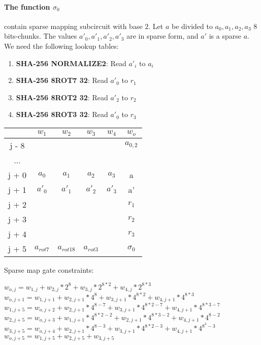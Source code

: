 \paragraph{The function $\sigma_0$} contain sparse mapping subcircuit with base $2$.
Let $a$ be divided to $a_0, a_1, a_2, a_3$ 8 bits-chunks.
The values $a'_0, a'_1, a'_2, a'_3$ are in sparse form, and $a'$ is a sparse $a$.
We need the following lookup tables:
\begin{enumerate}
\item \textbf{SHA-256 NORMALIZE2}: Read $a'_i$ to $a_i$
\item \textbf{SHA-256 8ROT7 32}: Read $a'_0$ to $r_1$
\item \textbf{SHA-256 8ROT2 32}: Read $a'_2$ to $r_2$
\item \textbf{SHA-256 8ROT3 32}: Read $a'_0$ to $r_3$
\end{enumerate}
\begin{center}
\begin{tabular}{ |c|c|c|c|c|c } 
  & $w_1$ & $w_2$ & $w_3$ & $w_4$ & $w_o$\\ 
 \hline
j - 8 &  &  &  &  & $a_{0, 2}$\\ 
... &&&&& \\
j + 0 & $a_0$ & $ a_1$ & $a_2$ & $a_3$ & a\\ 
j + 1 & $a'_0$ & $a'_1$ & $a'_2$ & $a'_3$ & a' \\ 
j + 2 & &  &  &  & $r_1$ \\
j + 3 & &  &  &  & $r_2 $ \\ 
j + 4 & &  &  &  & $r_3 $ \\ 
j + 5 & $a_{rot7} $& $a_{rot18}$ & $a_{rot3}$ &  & $\sigma_0$ \\ 
 \hline
\end{tabular}
\end{center}
Sparse map gate constraints:
\begin{center}
$w_{o,j} = w_{1,j} + w_{2,j}*2^8 + w_{3,j}*2^{8*2} + w_{4,j}*2^{8*3}$ \\
$w_{o,j+1} = w_{1,j+1} + w_{2,j+1}*4^8 + w_{3,j+1}*4^{8*2} + w_{4,j+1}*4^{8*3}$ \\
$w_{1,j+5} = w_{o,j+2} + w_{2,j+1}*4^{8-7} + w_{3,j+1}*4^{8*2-7} + w_{4,j+1}*4^{8*3 - 7}$ \\
$w_{2,j+5} = w_{o,j+3} + w_{1,j+1}*4^{8*2-2} + w_{2,j+1}*4^{8*3-2} + w_{4,j+1}*4^{8 - 2}$ \\
$w_{3,j+5} = w_{o,j+4} + w_{2,j+1}*4^{8-3} + w_{3,j+1}*4^{8*2-3} + w_{4,j+1}*4^{8^3 - 3}$ \\
$w_{o, j+5} = w_{1,j+5} + w_{2, j+5} + w_{3, j+5}$ \\
\end{center}

